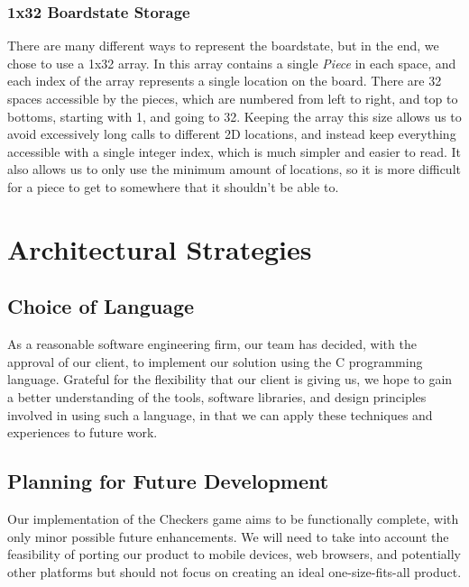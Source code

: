 \documentclass[letterpaper]{article}
\begin{document}
\subsubsection{1x32 Boardstate Storage}
\label{sec:design_rationale_boardstate}

There are many different ways to represent the boardstate, but
in the end, we chose to use a 1x32 array. In this array contains
a single \emph{Piece} in each space, and each index of the array
represents a single location on the board. There are 32 spaces
accessible by the pieces, which are numbered from left to right,
and top to bottoms, starting with 1, and going to 32. Keeping
the array this size allows us to avoid excessively long calls to
different 2D locations, and instead keep everything accessible
with a single integer index, which is much simpler and easier to
read. It also allows us to only use the minimum amount of
locations, so it is more difficult for a piece to get to
somewhere that it shouldn't be able to.


\section{Architectural Strategies}
\label{sec:strategies}

\subsection{Choice of Language}
\label{sec:strategies_language}

As a reasonable software engineering firm, our team has decided,
with the approval of our client, to implement our solution using
the C programming language. Grateful for the flexibility that
our client is giving us, we hope to gain a better understanding
of the tools, software libraries, and design principles involved
in using such a language, in that we can apply these techniques
and experiences to future work.

\subsection{Planning for Future Development}
\label{sec:strategies_future}

Our implementation of the Checkers game aims to be functionally
complete, with only minor possible future enhancements. We will
need to take into account the feasibility of porting our product
to mobile devices, web browsers, and potentially other platforms
but should not focus on creating an ideal one-size-fits-all
product.
\end{document}
